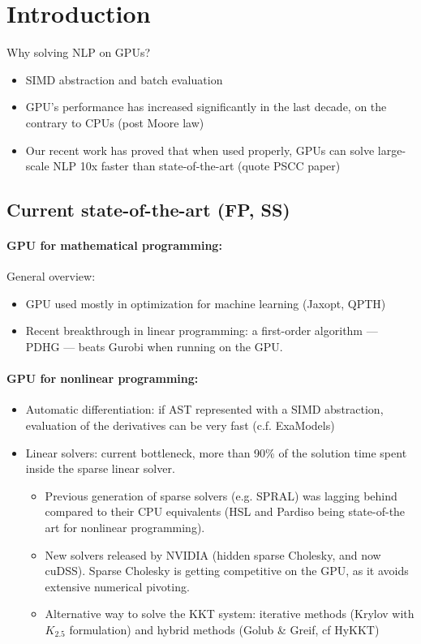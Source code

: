 \section{Introduction}
Why solving NLP on GPUs?
\begin{itemize}
  \item SIMD abstraction and batch evaluation
  \item GPU's performance has increased significantly in the last decade, on the contrary to CPUs (post Moore law)
  \item Our recent work has proved that when used properly,
    GPUs can solve large-scale NLP 10x faster than state-of-the-art (quote PSCC paper)
\end{itemize}

\subsection{Current state-of-the-art (FP, SS)}

\paragraph{GPU for mathematical programming:}
General overview:
\begin{itemize}
  \item GPU used mostly in optimization for machine learning (Jaxopt, QPTH)
  \item Recent breakthrough in linear programming: a first-order
    algorithm --- PDHG --- beats Gurobi when running on the GPU.
\end{itemize}

\paragraph{GPU for nonlinear programming:}
\begin{itemize}
  \item Automatic differentiation: if AST represented with a SIMD abstraction,
    evaluation of the derivatives can be very fast (c.f. ExaModels)
  \item Linear solvers: current bottleneck, more than 90\% of the solution time spent
    inside the sparse linear solver.
    \begin{itemize}
      \item Previous generation of sparse solvers (e.g. SPRAL)
        was lagging behind compared to their CPU equivalents (HSL and
        Pardiso being state-of-the art for nonlinear programming).
      \item New solvers released by NVIDIA (hidden sparse Cholesky, and now cuDSS).
        Sparse Cholesky is getting competitive on the GPU, as it avoids
        extensive numerical pivoting.
      \item Alternative way to solve the KKT system:
        iterative methods (Krylov with $K_{2.5}$ formulation)
        and hybrid methods (Golub \& Greif, cf HyKKT)
    \end{itemize}
\end{itemize}

